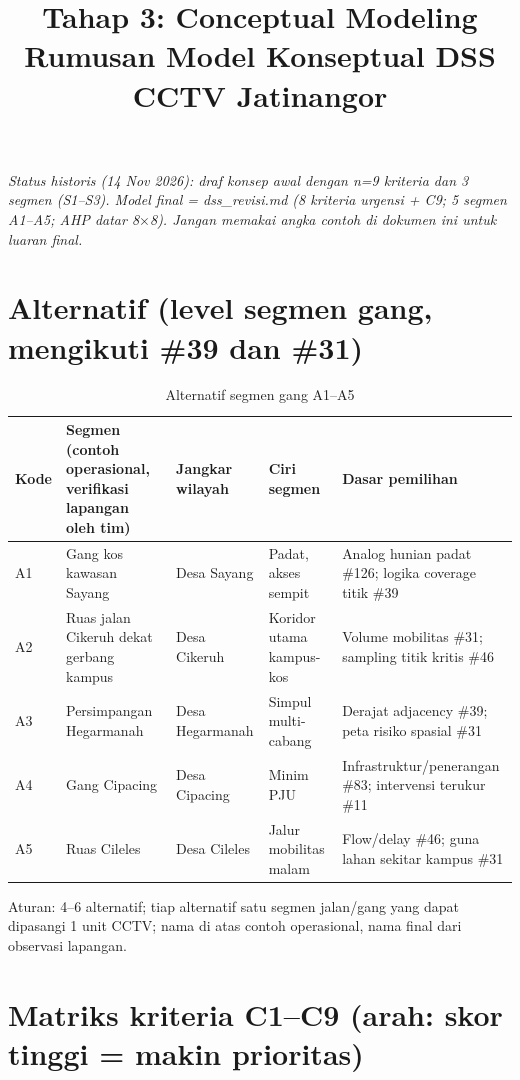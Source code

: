 \documentclass[a4paper,11pt]{article}
\title{Tahap 3: Conceptual Modeling\\
\large Rumusan Model Konseptual DSS CCTV Jatinangor}
\date{}
\begin{document}
\maketitle

\noindent\textit{Status historis (14 Nov 2026): draf konsep awal dengan n=9 kriteria dan 3 segmen (S1--S3). Model final = dss\_revisi.md (8 kriteria urgensi + C9; 5 segmen A1--A5; AHP datar 8$\times$8). Jangan memakai angka contoh di dokumen ini untuk luaran final.}

\section{Alternatif (level segmen gang, mengikuti \#39 dan \#31)}

\begin{table}[htbp]
\centering
\small
\setlength{\tabcolsep}{3pt}
\begin{tabular}{p{1.0cm}p{3.2cm}p{1.8cm}p{2.8cm}p{5.0cm}}
\toprule
\textbf{Kode} & \textbf{Segmen (contoh operasional, verifikasi lapangan oleh tim)} & \textbf{Jangkar wilayah} & \textbf{Ciri segmen} & \textbf{Dasar pemilihan} \\
\midrule
A1 & Gang kos kawasan Sayang & Desa Sayang & Padat, akses sempit & Analog hunian padat \#126; logika coverage titik \#39 \\
A2 & Ruas jalan Cikeruh dekat gerbang kampus & Desa Cikeruh & Koridor utama kampus-kos & Volume mobilitas \#31; sampling titik kritis \#46 \\
A3 & Persimpangan Hegarmanah & Desa Hegarmanah & Simpul multi-cabang & Derajat adjacency \#39; peta risiko spasial \#31 \\
A4 & Gang Cipacing & Desa Cipacing & Minim PJU & Infrastruktur/penerangan \#83; intervensi terukur \#11 \\
A5 & Ruas Cileles & Desa Cileles & Jalur mobilitas malam & Flow/delay \#46; guna lahan sekitar kampus \#31 \\
\bottomrule
\end{tabular}
\caption{Alternatif segmen gang A1--A5}
\end{table}

Aturan: 4--6 alternatif; tiap alternatif satu segmen jalan/gang yang dapat dipasangi 1 unit CCTV; nama di atas contoh operasional, nama final dari observasi lapangan.

\section{Matriks kriteria C1--C9 (arah: skor tinggi = makin prioritas)}
\end{document}
